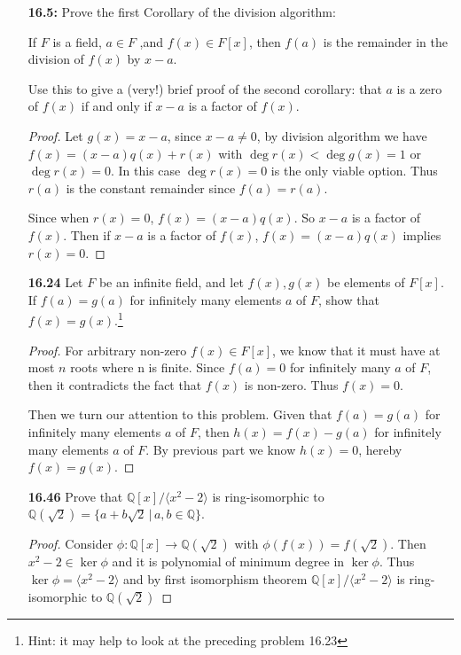 \documentclass[11pt, oneside]{article}
\newcommand{\Q}{\mathbb Q}
\begin{document}
\begin{enumerate}
\begin{proof}
Thus applying $\phi$ to $r_k<x$ we have $\phi(\lim(r_k))=\lim \phi(r_k)=\lim r_k=x < \phi(x)$ which contradicts our assumption. $\phi(a)=a$ and $\phi$ is hereby identity map. 

\end{proof}
\newpage
\item[{\bf 16.5:}] Prove the first Corollary of the division algorithm: 

If $F$ is a field, $a\in F$ ,and $f(x)\in F[x]$, then $f(a)$ is the remainder in the division of $f(x)$ by $x-a$. 

Use this to give a (very!) brief proof of the second corollary: that $a$ is a zero of $f(x)$ if and only if $x-a$ is a factor of $f(x)$.

\begin{proof}
Let $g(x)=x-a$, since $x-a\neq 0$, by division algorithm we have $f(x)=(x-a)q(x)+r(x)$ with $\deg r(x)<\deg g(x)=1$ or $\deg r(x)=0$. In this case $\deg r(x)=0$ is the only viable option. Thus $r(a)$ is the constant remainder since $f(a)=r(a)$.

Since when $r(x)=0$, $f(x)=(x-a)q(x)$. So $x-a$ is a factor of $f(x)$. Then if $x-a$ is a factor of $f(x)$, $f(x)=(x-a)q(x)$ implies $r(x)=0$.
\end{proof}

\newpage
\item[{\bf 16.24}] Let $F$ be an infinite field, and let $f(x), g(x)$ be elements of $F[x]$. If $f(a)=g(a)$ for infinitely many elements $a$ of $F$, show that $f(x)=g(x)$.\footnote{Hint: it may help to look at the preceding problem 16.23}
\begin{proof}
For arbitrary non-zero $f(x)\in F[x]$, we know that it must have at most $n$ roots where n is finite. Since $f(a)=0$ for infinitely many $a$ of $F$, then it contradicts the fact that $f(x)$ is non-zero. Thus $f(x)=0$.


Then we turn our attention to this problem. Given that $f(a)=g(a)$ for infinitely many elements $a$ of $F$, then $h(x)=f(x)-g(a)$ for infinitely many elements $a$ of $F$. By previous part we know $h(x)=0$, hereby $f(x)=g(x)$.
\end{proof}

\newpage
\item[{\bf 16.46}] Prove that $\Q[x]/\langle x^2-2\rangle$ is ring-isomorphic to $\Q(\sqrt 2) = \{a+b\sqrt 2\,|\, a,b\in \Q\}$. 
\begin{proof}
Consider $\phi: \Q[x]\rightarrow \Q(\sqrt 2)$ with $\phi(f(x))=f(\sqrt{2})$. Then $x^2-2\in \ker \phi$ and it is polynomial of minimum degree in $\ker \phi$. Thus $\ker \phi=\langle x^2-2 \rangle$ and by first isomorphism theorem $\Q[x]/\langle x^2-2\rangle$ is ring-isomorphic to $\Q(\sqrt 2)$
\end{proof}


\end{enumerate}
\end{document}
